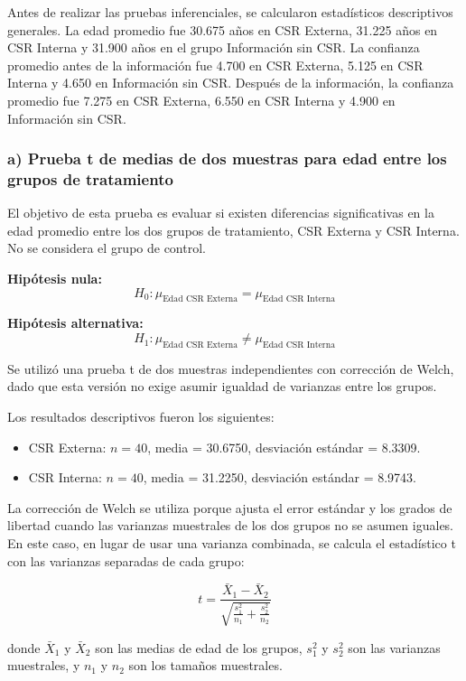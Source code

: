 \documentclass[12pt,letterpaper]{article}
\begin{document}
Antes de realizar las pruebas inferenciales, se calcularon estadísticos descriptivos generales. La edad promedio fue 30.675 años en CSR Externa, 31.225 años en CSR Interna y 31.900 años en el grupo Información sin CSR. La confianza promedio antes de la información fue 4.700 en CSR Externa, 5.125 en CSR Interna y 4.650 en Información sin CSR. Después de la información, la confianza promedio fue 7.275 en CSR Externa, 6.550 en CSR Interna y 4.900 en Información sin CSR.

\subsubsection*{a) Prueba t de medias de dos muestras para edad entre los grupos de tratamiento}

El objetivo de esta prueba es evaluar si existen diferencias significativas en la edad promedio entre los dos grupos de tratamiento, CSR Externa y CSR Interna. No se considera el grupo de control.

\textbf{Hipótesis nula:}
\[
H_0: \mu_{\text{Edad CSR Externa}} = \mu_{\text{Edad CSR Interna}}
\]

\textbf{Hipótesis alternativa:}
\[
H_1: \mu_{\text{Edad CSR Externa}} \neq \mu_{\text{Edad CSR Interna}}
\]

Se utilizó una prueba t de dos muestras independientes con corrección de Welch, dado que esta versión no exige asumir igualdad de varianzas entre los grupos.

Los resultados descriptivos fueron los siguientes:

\begin{itemize}
    \item CSR Externa: \(n = 40\), media = 30.6750, desviación estándar = 8.3309.
    \item CSR Interna: \(n = 40\), media = 31.2250, desviación estándar = 8.9743.
\end{itemize}

La corrección de Welch se utiliza porque ajusta el error estándar y los grados de libertad cuando las varianzas muestrales de los dos grupos no se asumen iguales. En este caso, en lugar de usar una varianza combinada, se calcula el estadístico t con las varianzas separadas de cada grupo:

\[
t =
\frac{\bar{X}_1 - \bar{X}_2}
{\sqrt{\frac{s_1^2}{n_1} + \frac{s_2^2}{n_2}}}
\]

donde \(\bar{X}_1\) y \(\bar{X}_2\) son las medias de edad de los grupos, \(s_1^2\) y \(s_2^2\) son las varianzas muestrales, y \(n_1\) y \(n_2\) son los tamaños muestrales.
\end{document}

